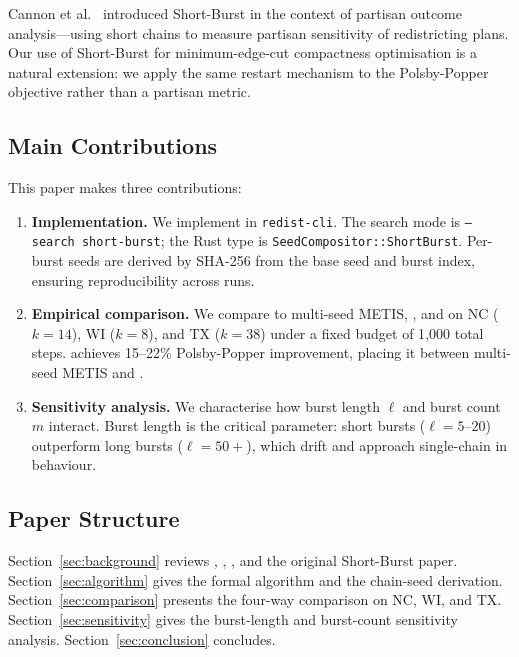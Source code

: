 Cannon et al.~\citep{cannon2022} introduced Short-Burst in the context
of partisan outcome analysis---using short chains to measure partisan
sensitivity of redistricting plans.
Our use of Short-Burst for minimum-edge-cut compactness optimisation is
a natural extension: we apply the same restart mechanism to the
Polsby-Popper objective rather than a partisan metric.

\subsection{Main Contributions}

This paper makes three contributions:

\begin{enumerate}
\item \textbf{Implementation.}
      We implement \shb{} in \texttt{redist-cli}.
      The search mode is \texttt{--search short-burst};
      the Rust type is \texttt{SeedCompositor::ShortBurst}.
      Per-burst seeds are derived by SHA-256 from the base seed
      and burst index, ensuring reproducibility across runs.

\item \textbf{Empirical comparison.}
      We compare \shb{} to multi-seed METIS, \cs{}, and \be{}
      on NC ($k=14$), WI ($k=8$), and TX ($k=38$) under a fixed budget
      of 1{,}000 total \recom{} steps.
      \shb{} achieves 15--22\% Polsby-Popper improvement, placing it
      between multi-seed METIS and \be{}.

\item \textbf{Sensitivity analysis.}
      We characterise how burst length $\ell$ and burst count $m$ interact.
      Burst length is the critical parameter: short bursts ($\ell = 5$--$20$)
      outperform long bursts ($\ell = 50+$), which drift and approach
      single-chain \recom{} in behaviour.
\end{enumerate}

\subsection{Paper Structure}

Section~\ref{sec:background} reviews \recom{}, \cs{}, \be{}, and the
original Short-Burst paper.
Section~\ref{sec:algorithm} gives the formal algorithm and the chain-seed
derivation.
Section~\ref{sec:comparison} presents the four-way comparison on NC, WI,
and TX.
Section~\ref{sec:sensitivity} gives the burst-length and burst-count
sensitivity analysis.
Section~\ref{sec:conclusion} concludes.

